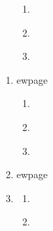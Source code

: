 \documentclass[12pt]{article}
\begin{document}
\begin{enumerate}
    \begin{enumerate}
      \item \textit{}



      \item \textit{}



      \item \textit{}



    \end{enumerate}    
    
    
    
ewpage
    \item \textit{}    
    
    \begin{enumerate}
      \item \textit{}



      \item \textit{}



      \item \textit{}



    \end{enumerate}    
    
    
    
ewpage
    \item \textit{}    
    
    \begin{enumerate}
      \item \textit{}



      \item \textit{}



      \item \textit{}



    \end{enumerate}    
    
    
    
    
ewpage
    \item \textit{}    
    
    \begin{enumerate}
      \item \textit{}



      \item \textit{}




\end{enumerate}
\end{enumerate}
\end{document}
